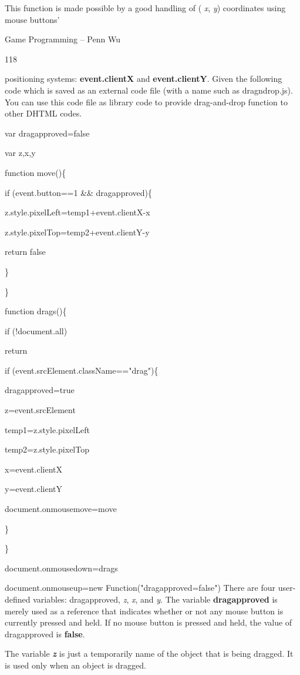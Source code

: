 \documentclass[
]{article}
\begin{document}
This function is made possible by a good handling of ( \emph{x},
\emph{y}) coordinates using mouse buttons'

Game Programming -- Penn Wu

118

\protect\hypertarget{index_split_008.htmlux5cux23p119}{}{}positioning
systems: \textbf{event.clientX} and \textbf{event.clientY}. Given the
following code which is saved as an external code file (with a name such
as dragndrop.js). You can use this code file as library code to provide
drag-and-drop function to other DHTML codes.

var dragapproved=false

var z,x,y

function move()\{

if (event.button==1 \&\& dragapproved)\{

z.style.pixelLeft=temp1+event.clientX-x

z.style.pixelTop=temp2+event.clientY-y

return false

\}

\}

function drags()\{

if (!document.all)

return

if (event.srcElement.className=="drag")\{

dragapproved=true

z=event.srcElement

temp1=z.style.pixelLeft

temp2=z.style.pixelTop

x=event.clientX

y=event.clientY

document.onmousemove=move

\}

\}

document.onmousedown=drags

document.onmouseup=new Function("dragapproved=false") There are four
user-defined variables: dragapproved, \emph{z}, \emph{x}, and \emph{y}.
The variable \textbf{dragapproved} is merely used as a reference that
indicates whether or not any mouse button is currently pressed and held.
If no mouse button is pressed and held, the value of dragapproved is
\textbf{false}.

The variable \emph{\textbf{z}} is just a temporarily name of the object
that is being dragged. It is used only when an object is dragged.
\end{document}
